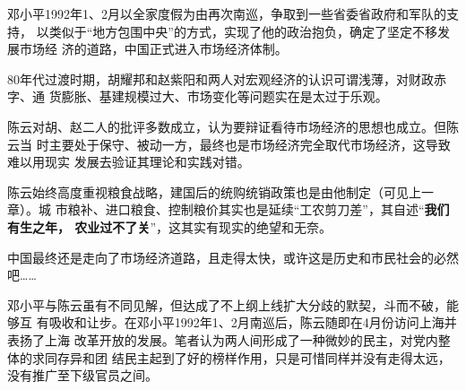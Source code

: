 邓小平1992年1、2月以全家度假为由再次南巡，争取到一些省委省政府和军队的支持，
以类似于“地方包围中央”的方式，实现了他的政治抱负，确定了坚定不移发展市场经
济的道路，中国正式进入市场经济体制。

80年代过渡时期，胡耀邦和赵紫阳和两人对宏观经济的认识可谓浅薄，对财政赤字、通
货膨胀、基建规模过大、市场变化等问题实在是太过于乐观。

陈云对胡、赵二人的批评多数成立，认为要辩证看待市场经济的思想也成立。但陈云当
时主要处于保守、被动一方，最终也是市场经济完全取代市场经济，这导致难以用现实
发展去验证其理论和实践对错。

陈云始终高度重视粮食战略，建国后的统购统销政策也是由他制定（可见上一章）。城
市粮补、进口粮食、控制粮价其实也是延续“工农剪刀差”，其自述“\textbf{我们有生之年，
  农业过不了关}”，这其实有现实的绝望和无奈。

中国最终还是走向了市场经济道路，且走得太快，或许这是历史和市民社会的必然吧……



邓小平与陈云虽有不同见解，但达成了不上纲上线扩大分歧的默契，斗而不破，能够互
有吸收和让步。在邓小平1992年1、2月南巡后，陈云随即在4月份访问上海并表扬了上海
改革开放的发展。笔者认为两人间形成了一种微妙的民主，对党内整体的求同存异和团
结民主起到了好的榜样作用，只是可惜同样并没有走得太远，没有推广至下级官员之间。





